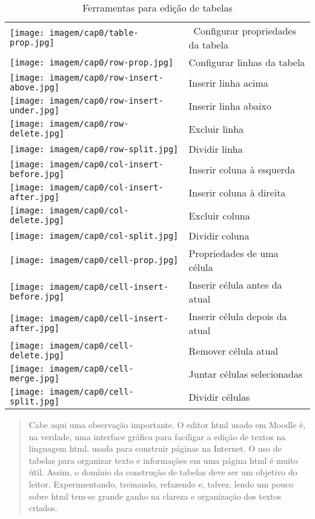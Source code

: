 \begin{table}
\begin{center}
 \begin{tabular}{m{0.5cm} m{6.0cm}} \\
  \texttt{[image: imagem/cap0/table-prop.jpg]} & \ Configurar propriedades da tabela \\
  \texttt{[image: imagem/cap0/row-prop.jpg]} & Configurar linhas da tabela \\
  \texttt{[image: imagem/cap0/row-insert-above.jpg]} & Inserir linha acima \\
  \texttt{[image: imagem/cap0/row-insert-under.jpg]} & Inserir linha abaixo \\
  \texttt{[image: imagem/cap0/row-delete.jpg]} & Excluir linha \\
  \texttt{[image: imagem/cap0/row-split.jpg]} & Dividir linha \\
  \texttt{[image: imagem/cap0/col-insert-before.jpg]} & Inserir coluna à esquerda \\
  \texttt{[image: imagem/cap0/col-insert-after.jpg]} & Inserir coluna à direita \\
  \texttt{[image: imagem/cap0/col-delete.jpg]} & Excluir coluna \\
  \texttt{[image: imagem/cap0/col-split.jpg]} & Dividir coluna \\
  \texttt{[image: imagem/cap0/cell-prop.jpg]} & Propriedades de uma célula \\
  \texttt{[image: imagem/cap0/cell-insert-before.jpg]} & Inserir célula antes da atual \\
  \texttt{[image: imagem/cap0/cell-insert-after.jpg]} & Inserir célula depois da atual \\
  \texttt{[image: imagem/cap0/cell-delete.jpg]} & Remover célula atual \\
  \texttt{[image: imagem/cap0/cell-merge.jpg]} & Juntar células selecionadas \\
  \texttt{[image: imagem/cap0/cell-split.jpg]} & Dividir células \\ \hline
 \end{tabular}
\caption{Ferramentas para edição de tabelas}
\end{center}
\end{table}

\begin{quotation}
 Cabe aqui uma observação importante. O editor html usado em Moodle é, na verdade, uma interface gráfica para faciligar a edição de textos na linguagem html, usada para construir páginas na Internet. O uso de tabelas para organizar texto e informações em uma página html é muito útil. Assim, o domínio da construção de tabelas deve ser um objetivo do leitor. Experimentando, treinando, refazendo e, talvez, lendo um pouco sobre html tem-se grande ganho na clareza e organização dos textos criados.
\end{quotation}

